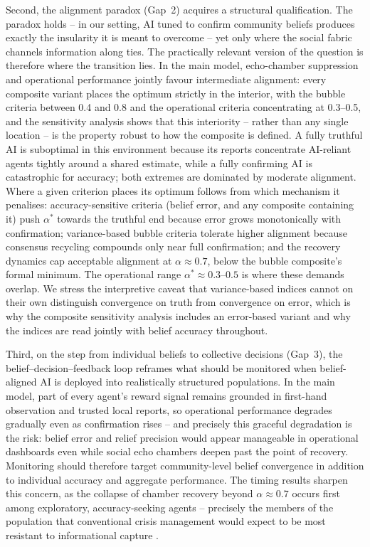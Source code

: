\documentclass[pdflatex,sn-nature]{sn-jnl}
\begin{document}
Second, the alignment paradox (Gap~2) \citep{west2025alignment} acquires a structural qualification. The paradox holds -- in our setting, AI tuned to confirm community beliefs produces exactly the insularity it is meant to overcome -- yet only where the social fabric channels information along ties. The practically relevant version of the question is therefore where the transition lies. In the main model, echo-chamber suppression and operational performance jointly favour intermediate alignment: every composite variant places the optimum strictly in the interior, with the bubble criteria between 0.4 and 0.8 and the operational criteria concentrating at 0.3--0.5, and the sensitivity analysis shows that this interiority -- rather than any single location -- is the property robust to how the composite is defined. A fully truthful AI is suboptimal in this environment because its reports concentrate AI-reliant agents tightly around a shared estimate, while a fully confirming AI is catastrophic for accuracy; both extremes are dominated by moderate alignment. Where a given criterion places its optimum follows from which mechanism it penalises: accuracy-sensitive criteria (belief error, and any composite containing it) push $\alpha^{*}$ towards the truthful end because error grows monotonically with confirmation; variance-based bubble criteria tolerate higher alignment because consensus recycling compounds only near full confirmation; and the recovery dynamics cap acceptable alignment at $\alpha \approx 0.7$, below the bubble composite's formal minimum. The operational range $\alpha^{*} \approx 0.3$--$0.5$ is where these demands overlap. We stress the interpretive caveat that variance-based indices cannot on their own distinguish convergence on truth from convergence on error, which is why the composite sensitivity analysis includes an error-based variant and why the indices are read jointly with belief accuracy throughout.

Third, on the step from individual beliefs to collective decisions (Gap~3), the belief--decision--feedback loop reframes what should be monitored when belief-aligned AI is deployed into realistically structured populations. In the main model, part of every agent's reward signal remains grounded in first-hand observation and trusted local reports, so operational performance degrades gradually even as confirmation rises -- and precisely this graceful degradation is the risk: belief error and relief precision would appear manageable in operational dashboards even while social echo chambers deepen past the point of recovery. Monitoring should therefore target community-level belief convergence in addition to individual accuracy and aggregate performance. The timing results sharpen this concern, as the collapse of chamber recovery beyond $\alpha \approx 0.7$ occurs first among exploratory, accuracy-seeking agents -- precisely the members of the population that conventional crisis management would expect to be most resistant to informational capture \citep{comes2020coordination}.
\end{document}
